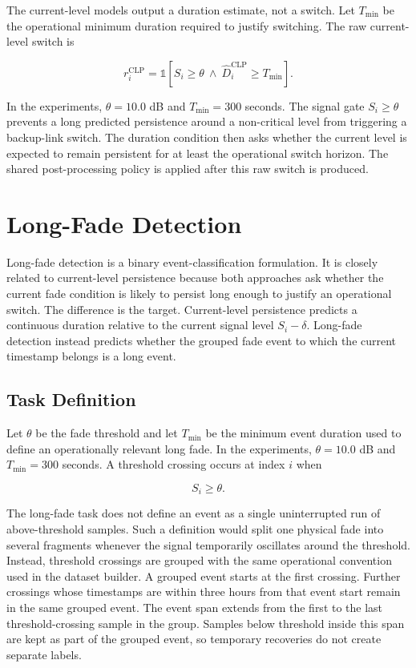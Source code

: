 The current-level models output a duration estimate, not a switch. Let
\(T_{\min}\) be the operational minimum duration required to justify switching.
The raw current-level switch is

\[
  r_i^{\text{CLP}}
  =
  \mathbb{1}
  \left[
    S_i \ge \theta
    \ \land\
    \widehat{D}_i^{\text{CLP}} \ge T_{\min}
  \right].
\]

In the experiments, \(\theta=10.0\) dB and \(T_{\min}=300\) seconds. The signal
gate \(S_i\ge\theta\) prevents a long predicted persistence around a
non-critical level from triggering a backup-link switch. The duration condition
then asks whether the current level is expected to remain persistent for at
least the operational switch horizon. The shared post-processing policy is
applied after this raw switch is produced.

\section{Long-Fade Detection}
\label{sec:long-fade-formulation}
Long-fade detection is a binary event-classification formulation. It is closely
related to current-level persistence because both approaches ask whether the
current fade condition is likely to persist long enough to justify an
operational switch. The difference is the target. Current-level persistence
predicts a continuous duration relative to the current signal level
\(S_i-\delta\). Long-fade detection instead predicts whether the grouped fade
event to which the current timestamp belongs is a long event.

\subsection{Task Definition}
Let \(\theta\) be the fade threshold and let \(T_{\min}\) be the minimum event
duration used to define an operationally relevant long fade. In the experiments,
\(\theta=10.0\) dB and \(T_{\min}=300\) seconds. A threshold crossing occurs at
index \(i\) when

\[
  S_i \ge \theta .
\]

The long-fade task does not define an event as a single uninterrupted run of
above-threshold samples. Such a definition would split one physical fade into
several fragments whenever the signal temporarily oscillates around the
threshold. Instead, threshold crossings are grouped with the same operational
convention used in the dataset builder. A grouped event starts at the first
crossing. Further crossings whose timestamps are within three hours from that
event start remain in the same grouped event. The event span extends from the
first to the last threshold-crossing sample in the group. Samples below
threshold inside this span are kept as part of the grouped event, so temporary
recoveries do not create separate labels.


